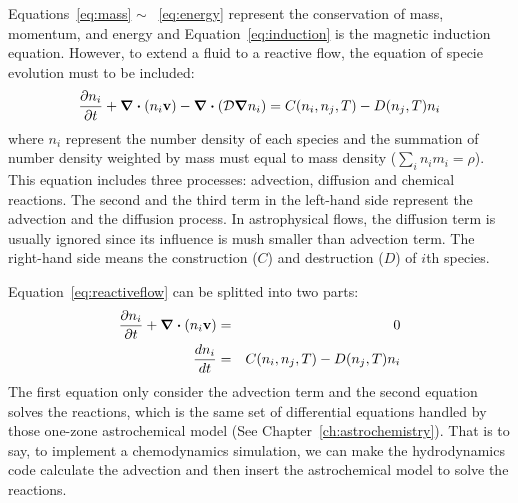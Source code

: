 Equations~\ref{eq:mass} $\sim$ ~\ref{eq:energy} represent the conservation of mass, momentum, and energy and Equation~\ref{eq:induction} is the magnetic induction equation. However, to extend a fluid to a reactive flow, the equation of specie evolution must to be included:
\begin{equation}
    \frac{\partial n_i}{\partial t} + \div (n_i {\bf v}) - \div ({\cal D} \grad n_i) = C(n_i, n_j, T) - D(n_j, T)n_i
    \label{eq:reactiveflow}
\end{equation}
where $n_i$ represent the number density of each species and the summation of number density weighted by mass must equal to mass density ($\displaystyle \sum_i n_i m_i = \rho$). This equation includes three processes: advection, diffusion and chemical reactions. The second and the third term in the left-hand side represent the advection and the diffusion process. In astrophysical flows, the diffusion term is usually ignored since its influence is mush smaller than advection term. The right-hand side means the construction ($C$) and destruction ($D$) of $i$th species. 


Equation~\ref{eq:reactiveflow} can be splitted into two parts:
\begin{eqnarray}
    \frac{\partial n_i}{\partial t} + \div (n_i {\bf v}) &=& 0 \\
    \frac{d n_i}{dt} &=& C(n_i, n_j, T) - D(n_j, T)n_i
\end{eqnarray}
The first equation only consider the advection term and the second equation solves the reactions, which is the same set of differential equations handled by those one-zone astrochemical model (See Chapter~\ref{ch:astrochemistry}). That is to say, to implement a chemodynamics simulation, we can make the hydrodynamics code calculate the advection and then insert the astrochemical model to solve the reactions.






